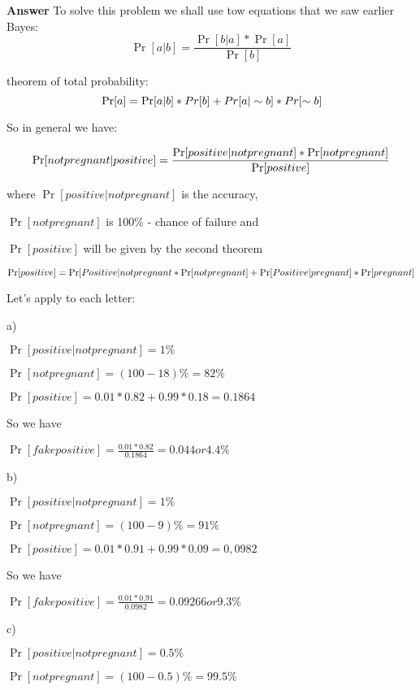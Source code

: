 \documentclass{book}
\begin{document}
\textbf{Answer}
To solve this problem we shall use tow equations that we saw earlier
\large{Bayes: }
\begin{equation*}
 \Pr[a|b]=\frac{\Pr[b|a]*\Pr[a]}{\Pr[b]}
\end{equation*}


 \large{theorem of total probability:}
\begin{equation*}
    \\ \Pr[a]=\Pr[a|b]*Pr[b]+Pr[a|\sim b]*Pr[\sim b]
\end{equation*}

So in general we have:

\begin{equation*}
    \large{\Pr[not pregnant| positive]=\frac{\Pr[positive|not pregnant]*\Pr[not pregnant]}{\Pr[positive]}}
\end{equation*}

where $\Pr[positive|not pregnant]$  is  the  accuracy,

$\Pr[not pregnant]$ is 100\% - chance of failure and 

$\Pr[positive]$ will be given by the second theorem

\begin{equation*}
\large{\Pr[positive]=\Pr[Positive|not pregnant}*\Pr[not pregnant]+\Pr[Positive|pregnant]*\Pr[pregnant]    
\end{equation*}

Let's apply to each letter:

a)

$\Pr[positive|not pregnant] = 1\%$

$\Pr[not pregnant]= (100-18)\%=82\%$

$\Pr[positive]=0.01*0.82+0.99*0.18=0.1864$

So we have

$\Pr[fake positive] = \frac{0.01*0.82}{0.1864}=0.044 or 4.4\%$


b)

$\Pr[positive|not pregnant] = 1\%$

$\Pr[not pregnant]= (100-9)\%=91\%$

$\Pr[positive]=0.01*0.91+0.99*0.09=0,0982$

So we have

$\Pr[fake positive] = \frac{0.01*0.91}{0.0982}=0.09266 or 9.3\%$

c)

$\Pr[positive|not pregnant] = 0.5\%$

$\Pr[not pregnant]= (100-0.5)\%=99.5\%$
\end{document}
